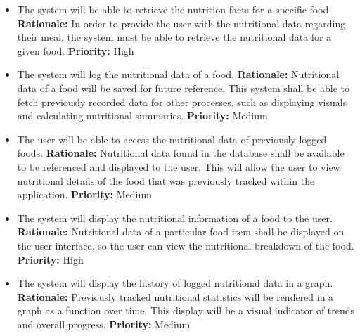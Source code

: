 \documentclass[12pt]{article}
\newcounter{FRCounter}
\newcommand{\FillFRNumber}{\textbf{FR\arabic{FRCounter}.} \stepcounter{FRCounter}}
\begin{document}
\begin{itemize}
    \item [\FillFRNumber] The system will be able to retrieve the nutrition facts for a specific food.\newline
    \textbf{Rationale:} In order to provide the user with the nutritional data regarding their meal, the system must be able to retrieve the nutritional data for a given food.\newline
    \textbf{Priority:} High
\end{itemize}

\begin{itemize}
	\item [\FillFRNumber] The system will log the nutritional data of a food.\newline
	\textbf{Rationale:} Nutritional data of a food will be saved for future reference. This system shall be able to fetch previously recorded data for other processes, such as displaying visuals and calculating nutritional summaries.\newline
	\textbf{Priority:} Medium
\end{itemize}

\begin{itemize}
	\item [\FillFRNumber] The user will be able to access the nutritional data of previously logged foods. \newline
	\textbf{Rationale:} Nutritional data found in the database shall be available to be referenced and displayed to the user. This will allow the user to view nutritional details of the food that was previously tracked within the application. \newline
	\textbf{Priority:} Medium
\end{itemize}

\begin{itemize}
	\item [\FillFRNumber] The system will display the nutritional information of a food to the user. \newline
	\textbf{Rationale:} Nutritional data of a particular food item shall be displayed on the user interface, so the user can view the nutritional breakdown of the food.\newline
	\textbf{Priority:} High
\end{itemize}

\begin{itemize}
	\item [\FillFRNumber] The system will display the history of logged nutritional data in a graph.\newline 
	\textbf{Rationale:} Previously tracked nutritional statistics will be rendered in a graph as a function over time. This display will be a visual indicator of trends and overall progress.\newline
	\textbf{Priority:} Medium
\end{itemize}
\end{document}

